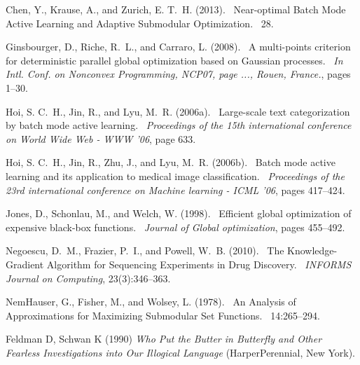\documentclass[opre,nonblindrev]{informs3} %
\def\newblock{\ }%
\begin{document}



\begin{thebibliography}{}

Chen, Y., Krause, A., and Zurich, E. T.~H. (2013).
\newblock {Near-optimal Batch Mode Active Learning and Adaptive Submodular
  Optimization}.
\newblock 28.

Ginsbourger, D., Riche, R.~L., and Carraro, L. (2008).
\newblock {A multi-points criterion for deterministic parallel global
  optimization based on Gaussian processes}.
\newblock {\em In Intl. Conf. on Nonconvex Programming, NCP07, page ..., Rouen,
  France.}, pages 1--30.

Hoi, S. C.~H., Jin, R., and Lyu, M.~R. (2006a).
\newblock {Large-scale text categorization by batch mode active learning}.
\newblock {\em Proceedings of the 15th international conference on World Wide
  Web - WWW '06}, page 633.

Hoi, S. C.~H., Jin, R., Zhu, J., and Lyu, M.~R. (2006b).
\newblock {Batch mode active learning and its application to medical image
  classification}.
\newblock {\em Proceedings of the 23rd international conference on Machine
  learning - ICML '06}, pages 417--424.

Jones, D., Schonlau, M., and Welch, W. (1998).
\newblock {Efficient global optimization of expensive black-box functions}.
\newblock {\em Journal of Global optimization}, pages 455--492.

Negoescu, D.~M., Frazier, P.~I., and Powell, W.~B. (2010).
\newblock {The Knowledge-Gradient Algorithm for Sequencing Experiments in Drug
  Discovery}.
\newblock {\em INFORMS Journal on Computing}, 23(3):346--363.

NemHauser, G., Fisher, M., and Wolsey, L. (1978).
\newblock {An Analysis of Approximations for Maximizing Submodular Set
  Functions}.
\newblock 14:265--294.

Feldman D, Schwan K (1990) {\it Who Put the Butter in Butterfly
and Other Fearless Investigations into Our Illogical Language}
(HarperPerennial, New York).


\end{thebibliography}
\end{document}

